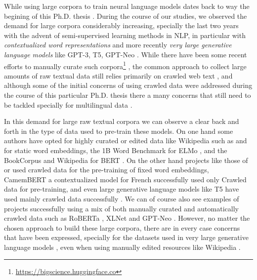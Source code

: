 While using large corpora to train neural language models dates back to way the begining of this Ph.D. thesis \citep{schwenk-gauvain-2005-training}. During the course of our studies, we observed the demand for large corpora considerably increasing, specially the last two years with the advent of semi-supervised learning methods in NLP, in particular with \emph{contextualized word representations} \citep{howard-ruder-2018-universal,peters-etal-2018-deep,devlin-etal-2019-bert} and more recently \emph{very large generative language models} like GPT-3, T5, GPT-Neo \citep{raffel-etal-2020-exploring,brown-etal-2020-language,black-etal-2021-gpt}. While there have been some recent efforts to manually curate such corpora\footnote{\url{https://bigscience.huggingface.co}} \citep{gao-etal-2020-pile}, the common approach to collect large amounts of raw textual data still relies primarily on crawled web text \citep{ortiz-suarez-etal-2019-asynchronous,ortiz-suarez-etal-2020-monolingual,xue-etal-2021-mt5,el-kishky-etal-2020-ccaligned,espla-etal-2019-paracrawl,banon-etal-2020-paracrawl,gao-etal-2020-pile}, and although some of the initial concerns of using crawled data \citep{trinh-le-2018-a,radford-etal-2019-language} were addressed during the course of this particular Ph.D. thesis \citep{ortiz-suarez-etal-2020-monolingual,martin-etal-2020-camembert} there a many concerns that still need to be tackled \citep{caswell-etal-2020-language} specially for multilingual data \citep{kreutzer-etal-2021-quality}.

In this demand for large raw textual corpora we can observe a clear back and forth in the type of data used to pre-train these models. On one hand some authors have opted for highly curated or edited data like Wikipedia such as \citet{al-rfou-etal-2013-polyglot} and \citet{bojanowski-etal-2017-enriching} for static word embeddings, the 1B Word Benchmark \citep{chelba-etal-2014-one} for ELMo \citep{peters-etal-2018-deep}, and the BookCorpus \citep{zhu-etal-2015-aligning} and Wikipedia for BERT \citep{devlin-etal-2019-bert}. On the other hand projects like those of \citet{pennington-etal-2014-glove} or \citet{grave-etal-2018-learning} used crawled data for the pre-training of fixed word embeddings, CamemBERT \citep{martin-etal-2020-camembert} a contextualized model for French successfully used only Crawled data for pre-training, and even large generative language models like T5 have used mainly crawled data successfully \citep{raffel-etal-2020-exploring}. We can of course also see examples of projects successfully using a mix of both manually curated and automatically crawled data such as RoBERTa \citep{liu-etal-2019-roberta}, XLNet \citep{yang-etal-2019-xlnet} and GPT-Neo \citep{black-etal-2021-gpt,gao-etal-2020-pile}. However, no matter the chosen approach to build these large corpora, there are in every case concerns that have been expressed, specially for the datasets used in very large generative language models \citep{bender-etal-2021-on}, even when using manually edited resources like Wikipedia \citep{barera-2020-mind}.

